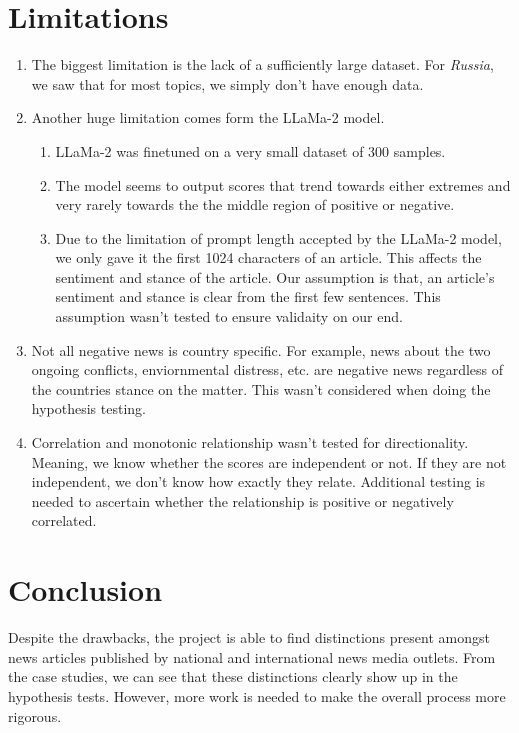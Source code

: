 \documentclass{article}
\theoremstyle{mytheoremstyle}
\theoremstyle{mytheoremstyle}
\theoremstyle{myproblemstyle}
\begin{document}
    \section{Limitations}

    \begin{enumerate}
        \item The biggest limitation is the lack of a sufficiently large dataset. For \emph{Russia}, we saw that for most topics, we simply don't have enough data.
        \item Another huge limitation comes form the LLaMa-2 model. \begin{enumerate}
            \item LLaMa-2 was finetuned on a very small dataset of 300 samples. 
            \item The model seems to output scores that trend towards either extremes and very rarely towards the the middle region of positive or negative.
            \item Due to the limitation of prompt length accepted by the LLaMa-2 model, we only gave it the first 1024 characters of an article. This affects the sentiment and stance of the article. Our assumption is that, an article's sentiment and stance is clear from the first few sentences. This assumption wasn't tested to ensure validaity on our end.
        \end{enumerate}
        \item Not all negative news is country specific. For example, news about the two ongoing conflicts, enviornmental distress, etc. are negative news regardless of the countries stance on the matter. This wasn't considered when doing the hypothesis testing.
        \item Correlation and monotonic relationship wasn't tested for directionality. Meaning, we know whether the scores are independent or not. If they are not independent, we don't know how exactly they relate. Additional testing is needed to ascertain whether the relationship is positive or negatively correlated.
    \end{enumerate}

    \section{Conclusion}

    Despite the drawbacks, the project is able to find distinctions present amongst news articles published by national and international news media outlets. From the case studies, we can see that these distinctions clearly show up in the hypothesis tests. However, more work is needed to make the overall process more rigorous.

    
    

    
\end{document}
